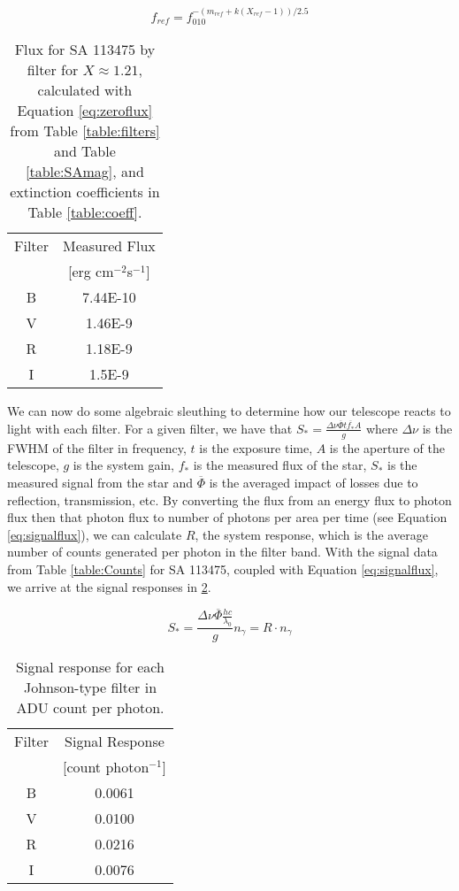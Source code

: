 \documentclass{article}
\newcommand{\obar}[1]{\ensuremath{\overline{ #1 }}}
\begin{document}
\begin{equation}
\label{eq:zeroflux}
f_{ref}=f_010^{-(m_{ref}+k(X_{ref}-1))/2.5}
\end{equation}

\begin{table}
\begin{center}
\begin{tabular}{c | c}
Filter & Measured Flux \\
& [erg cm$^{-2}$s$^{-1}$]\\
\hline
B & 7.44E-10\\
V & 1.46E-9\\
R & 1.18E-9\\
I & 1.5E-9
\end{tabular}
\caption{Flux for SA 113475 by filter for $X\approx1.21$, calculated with Equation \ref{eq:zeroflux} from Table \ref{table:filters}
and Table \ref{table:SAmag}, and extinction coefficients in Table \ref{table:coeff}.}
\label{table:SAflux}
\end{center}
\end{table}

We can now do some algebraic sleuthing to determine how our telescope reacts to light with each filter. For a given filter,
we have that $S_*=\frac{\Delta\nu{\obar{\Phi}}t{\obar{f_*}}A}{g}$ where $\Delta\nu$ is the FWHM of the filter in frequency,
$t$ is the exposure time, $A$ is the aperture of the telescope, $g$ is the system gain, $f_*$ is the measured flux
of the star, $S_*$ is the measured signal from the star and $\obar\Phi$ is the averaged impact of losses due to reflection, transmission, etc.
By converting the flux from an energy flux to photon flux then that photon flux to number of photons per area per time (see Equation
\ref{eq:signalflux}), we can calculate $R$, the system response, which is the average number of counts generated per photon in the filter band. 
With the signal data from Table \ref{table:Counts} for SA 113475, 
coupled with Equation \ref{eq:signalflux}, we arrive at the signal responses in \ref{table:response}.

\begin{equation}
\label{eq:signalflux}
S_*=\frac{\Delta\nu{\obar{\Phi}}\frac{hc}{\lambda_0}}{g}n_\gamma=R\cdot n_\gamma
\end{equation}

\begin{table}
\begin{center}
\begin{tabular}{c | c}
Filter & Signal Response \\
& [count photon$^{-1}$]\\
\hline
B & 0.0061\\
V & 0.0100\\
R & 0.0216\\
I & 0.0076
\end{tabular}
\caption{Signal response for each Johnson-type filter in ADU count per photon.}
\label{table:response}
\end{center}
\end{table}
\end{document}
